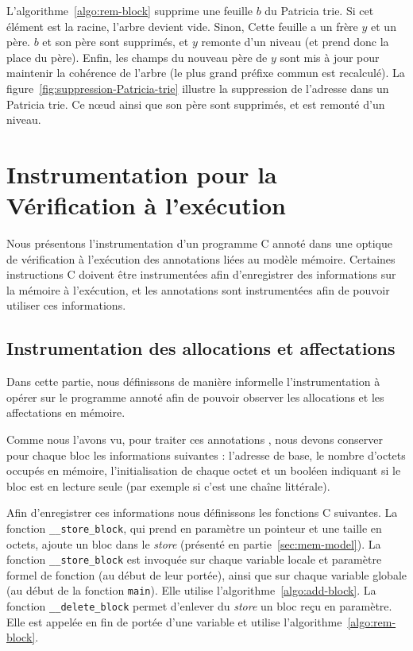 


L'algorithme~\ref{algo:rem-block} supprime une feuille $b$ du Patricia trie.
Si cet élément est la racine, l'arbre devient vide.
Sinon, Cette feuille a un frère $y$ et un père.
$b$ et son père sont supprimés, et $y$ remonte d'un niveau (et prend donc la
place du père).
Enfin, les champs du nouveau père de $y$ sont mis à jour pour maintenir la
cohérence de l'arbre (le plus grand préfixe commun est recalculé).
La figure~\ref{fig:suppression-Patricia-trie} illustre la suppression de
l'adresse  dans un Patricia trie.
Ce n\oe{}ud ainsi que son père  sont supprimés, et
 est remonté d'un niveau.


\section{Instrumentation pour la Vérification à l'exécution}
\label{sec:mem-instru}


Nous présentons l'instrumentation d'un programme C annoté dans une optique de
vérification à l'exécution des annotations liées au modèle mémoire.
Certaines instructions C doivent être instrumentées afin d'enregistrer
des informations sur la mémoire à l'exécution, et les annotations sont
instrumentées afin de pouvoir utiliser ces informations.


\subsection{Instrumentation des allocations et affectations}


Dans cette partie, nous définissons de manière informelle l'instrumentation à
opérer sur le programme annoté afin de pouvoir observer les allocations et
les affectations en mémoire.

Comme nous l'avons vu, pour traiter ces annotations \eacsl, nous devons
conserver pour chaque bloc les informations suivantes : l'adresse de base, le
nombre d'octets occupés en mémoire, l'initialisation de chaque octet et un
booléen indiquant si le bloc est en lecture seule (par exemple si c'est une
chaîne littérale).

Afin d'enregistrer ces informations nous définissons les fonctions C suivantes.
La fonction \lstinline'__store_block', qui prend en paramètre un pointeur et une
taille en octets, ajoute un bloc dans le \textit{store} (présenté en
partie~\ref{sec:mem-model}).
La fonction \lstinline'__store_block' est invoquée sur chaque variable locale
et paramètre formel de fonction (au début de leur portée), ainsi que sur chaque
variable globale (au début de la fonction \lstinline'main').
Elle utilise l'algorithme~\ref{algo:add-block}.
La fonction \lstinline'__delete_block' permet d'enlever du \textit{store} un
bloc reçu en paramètre.
Elle est appelée en fin de portée d'une variable et utilise
l'algorithme~\ref{algo:rem-block}.

